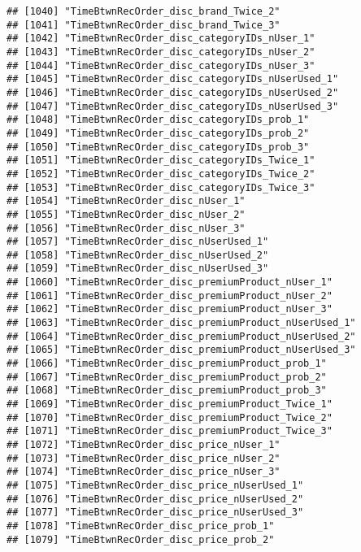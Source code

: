 \documentclass[10pt]{report}
\begin{document}
\begin{verbatim}
## [1040] "TimeBtwnRecOrder_disc_brand_Twice_2"                  
## [1041] "TimeBtwnRecOrder_disc_brand_Twice_3"                  
## [1042] "TimeBtwnRecOrder_disc_categoryIDs_nUser_1"            
## [1043] "TimeBtwnRecOrder_disc_categoryIDs_nUser_2"            
## [1044] "TimeBtwnRecOrder_disc_categoryIDs_nUser_3"            
## [1045] "TimeBtwnRecOrder_disc_categoryIDs_nUserUsed_1"        
## [1046] "TimeBtwnRecOrder_disc_categoryIDs_nUserUsed_2"        
## [1047] "TimeBtwnRecOrder_disc_categoryIDs_nUserUsed_3"        
## [1048] "TimeBtwnRecOrder_disc_categoryIDs_prob_1"             
## [1049] "TimeBtwnRecOrder_disc_categoryIDs_prob_2"             
## [1050] "TimeBtwnRecOrder_disc_categoryIDs_prob_3"             
## [1051] "TimeBtwnRecOrder_disc_categoryIDs_Twice_1"            
## [1052] "TimeBtwnRecOrder_disc_categoryIDs_Twice_2"            
## [1053] "TimeBtwnRecOrder_disc_categoryIDs_Twice_3"            
## [1054] "TimeBtwnRecOrder_disc_nUser_1"                        
## [1055] "TimeBtwnRecOrder_disc_nUser_2"                        
## [1056] "TimeBtwnRecOrder_disc_nUser_3"                        
## [1057] "TimeBtwnRecOrder_disc_nUserUsed_1"                    
## [1058] "TimeBtwnRecOrder_disc_nUserUsed_2"                    
## [1059] "TimeBtwnRecOrder_disc_nUserUsed_3"                    
## [1060] "TimeBtwnRecOrder_disc_premiumProduct_nUser_1"         
## [1061] "TimeBtwnRecOrder_disc_premiumProduct_nUser_2"         
## [1062] "TimeBtwnRecOrder_disc_premiumProduct_nUser_3"         
## [1063] "TimeBtwnRecOrder_disc_premiumProduct_nUserUsed_1"     
## [1064] "TimeBtwnRecOrder_disc_premiumProduct_nUserUsed_2"     
## [1065] "TimeBtwnRecOrder_disc_premiumProduct_nUserUsed_3"     
## [1066] "TimeBtwnRecOrder_disc_premiumProduct_prob_1"          
## [1067] "TimeBtwnRecOrder_disc_premiumProduct_prob_2"          
## [1068] "TimeBtwnRecOrder_disc_premiumProduct_prob_3"          
## [1069] "TimeBtwnRecOrder_disc_premiumProduct_Twice_1"         
## [1070] "TimeBtwnRecOrder_disc_premiumProduct_Twice_2"         
## [1071] "TimeBtwnRecOrder_disc_premiumProduct_Twice_3"         
## [1072] "TimeBtwnRecOrder_disc_price_nUser_1"                  
## [1073] "TimeBtwnRecOrder_disc_price_nUser_2"                  
## [1074] "TimeBtwnRecOrder_disc_price_nUser_3"                  
## [1075] "TimeBtwnRecOrder_disc_price_nUserUsed_1"              
## [1076] "TimeBtwnRecOrder_disc_price_nUserUsed_2"              
## [1077] "TimeBtwnRecOrder_disc_price_nUserUsed_3"              
## [1078] "TimeBtwnRecOrder_disc_price_prob_1"                   
## [1079] "TimeBtwnRecOrder_disc_price_prob_2"                   

\end{verbatim}
\end{document}
